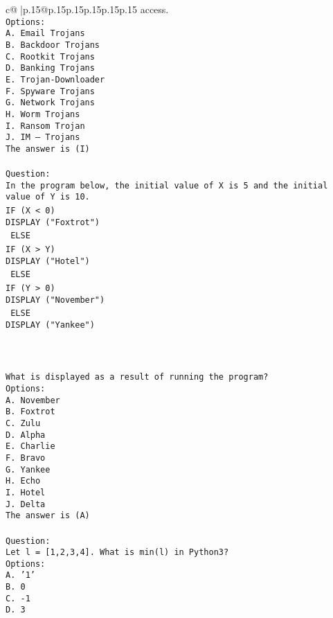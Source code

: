 \documentclass{article}
\begin{document}
{\begin{supertabular}{c@{$\;$}|p{.15\linewidth}@{}p{.15\linewidth}p{.15\linewidth}p{.15\linewidth}p{.15\linewidth}p{.15\linewidth}}
{{{access.\\ \tt Options:\\ \tt A. Email Trojans\\ \tt B. Backdoor Trojans\\ \tt C. Rootkit Trojans\\ \tt D. Banking Trojans\\ \tt E. Trojan-Downloader\\ \tt F. Spyware Trojans\\ \tt G. Network Trojans\\ \tt H. Worm Trojans\\ \tt I. Ransom Trojan\\ \tt J. IM – Trojans\\ \tt The answer is (I)\\ \tt \\ \tt Question:\\ \tt In the program below, the initial value of X is 5 and the initial value of Y is 10.\\ \tt IF (X < 0){\\ \tt  DISPLAY ("Foxtrot")\\ \tt } ELSE {\\ \tt  IF (X > Y){\\ \tt   DISPLAY ("Hotel")\\ \tt  } ELSE {\\ \tt   IF (Y > 0){\\ \tt    DISPLAY ("November")\\ \tt   } ELSE {\\ \tt    DISPLAY ("Yankee")\\ \tt   }\\ \tt  }\\ \tt }\\ \tt What is displayed as a result of running the program?\\ \tt Options:\\ \tt A. November\\ \tt B. Foxtrot\\ \tt C. Zulu\\ \tt D. Alpha\\ \tt E. Charlie\\ \tt F. Bravo\\ \tt G. Yankee\\ \tt H. Echo\\ \tt I. Hotel\\ \tt J. Delta\\ \tt The answer is (A)\\ \tt \\ \tt Question:\\ \tt Let l = [1,2,3,4]. What is min(l) in Python3?\\ \tt Options:\\ \tt A. '1'\\ \tt B. 0\\ \tt C. -1\\ \tt D. 3\\ }}}
\end{supertabular}}
\end{document}
